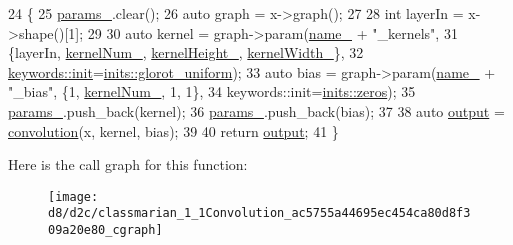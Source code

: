 \begin{DoxyCode}
24                             \{
25       \hyperlink{classmarian_1_1Convolution_a6a56e7a677386b591a1622732f53ae9a}{params\_}.clear();
26       \textcolor{keyword}{auto} graph = x->graph();
27 
28       \textcolor{keywordtype}{int} layerIn = x->shape()[1];
29 
30       \textcolor{keyword}{auto} kernel = graph->param(\hyperlink{classmarian_1_1Convolution_adf629c3e64cd0bd05a742543144512d5}{name\_} + \textcolor{stringliteral}{"\_kernels"},
31           \{layerIn, \hyperlink{classmarian_1_1Convolution_aaf7c9a32c5b843d261548abcedd2f25d}{kernelNum\_}, \hyperlink{classmarian_1_1Convolution_aa2e7a504274fbe1bd24fce5fe89d6ff7}{kernelHeight\_}, 
      \hyperlink{classmarian_1_1Convolution_a4b65ffe7fe84099465ecf6e0e402f4aa}{kernelWidth\_}\},
32           \hyperlink{namespacemarian_1_1keywords_afdd3807e3d6fe2bc979d11fa0cf3ee3e}{keywords::init}=\hyperlink{namespacemarian_1_1inits_a8838c47537f434b855491cd3ed97ccd1}{inits::glorot\_uniform});
33       \textcolor{keyword}{auto} bias = graph->param(\hyperlink{classmarian_1_1Convolution_adf629c3e64cd0bd05a742543144512d5}{name\_} + \textcolor{stringliteral}{"\_bias"},  \{1, \hyperlink{classmarian_1_1Convolution_aaf7c9a32c5b843d261548abcedd2f25d}{kernelNum\_}, 1, 1\},
34                                keywords::init=\hyperlink{namespacemarian_1_1inits_a1bd34fd256e3df7bb1e27955a7f2b359}{inits::zeros});
35       \hyperlink{classmarian_1_1Convolution_a6a56e7a677386b591a1622732f53ae9a}{params\_}.push\_back(kernel);
36       \hyperlink{classmarian_1_1Convolution_a6a56e7a677386b591a1622732f53ae9a}{params\_}.push\_back(bias);
37 
38       \textcolor{keyword}{auto} \hyperlink{namespacetest_a07b64f21658cf1faa97a31563ac979d2}{output} = \hyperlink{namespacemarian_a3dbe8b5eb203876cd08cf3fe75a1c6bc}{convolution}(x, kernel, bias);
39 
40       \textcolor{keywordflow}{return} \hyperlink{namespacetest_a07b64f21658cf1faa97a31563ac979d2}{output};
41     \}
\end{DoxyCode}


Here is the call graph for this function\+:
\nopagebreak
\begin{figure}[H]
\begin{center}
\leavevmode
\texttt{[image: d8/d2c/classmarian\_1\_1Convolution\_ac5755a44695ec454ca80d8f309a20e80\_cgraph]}
\end{center}
\end{figure}


